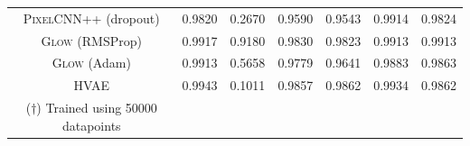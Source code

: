 {\begin{table}[tb]
{\begin{tabular}{ccccccc}
            \midrule
            \textsc{PixelCNN++} (dropout)  & 0.9820 & 0.2670 &  0.9590 &  0.9543 & 0.9914 & 0.9824 \\
            \textsc{Glow} (RMSProp)  &  0.9917  & 0.9180 & 0.9830 & 0.9823 & 0.9913  & 0.9913 \\
            \textsc{Glow} (Adam)   &0.9913 &  0.5658 & 0.9779 & 0.9641 & 0.9883 & 0.9863 \\
            \textsc{HVAE}  & 0.9943 &  0.1011  &  0.9857 &  0.9862 & 0.9934 &  0.9862 \\
            \bottomrule
            ($\dagger$) Trained using 50000 datapoints
        \end{tabular}
        \label{tab_modelagnostic:results_second}
    }
\end{table}


\begin{table}[tb]
    \caption{AUROC$\uparrow$ for single-sample OOD detection. In this table we consider all the different single statistics we mentioned in the paper but for the models trained on MNIST and SVHN this time. In this case, it is important to notice that the gradient norm and the MMD identity sometimes fail to a different extent.}
\end{table}}
